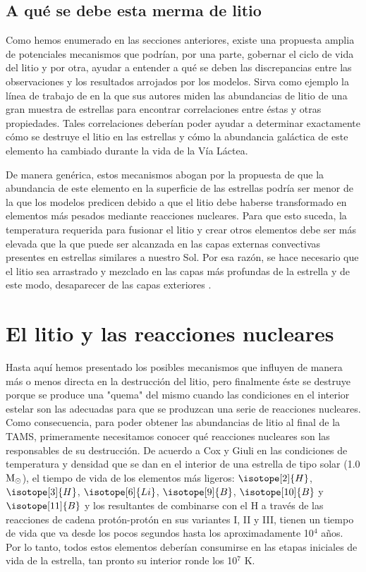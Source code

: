 \subsection{A qué se debe esta merma de litio}
Como hemos enumerado en las secciones anteriores, existe una propuesta amplia de potenciales mecanismos que podrían, por una parte, gobernar el ciclo de vida del litio y por otra, ayudar a entender a qué se deben las discrepancias entre las observaciones y los resultados arrojados por los modelos. Sirva como ejemplo la línea de trabajo de \cite{Ramirez2012} en la que sus autores miden las abundancias de litio de una gran muestra de estrellas para encontrar correlaciones entre éstas y otras propiedades. Tales correlaciones deberían poder ayudar a determinar exactamente cómo se destruye el litio en las estrellas y cómo la abundancia galáctica de este elemento ha cambiado durante la vida de la Vía Láctea.\par 

De manera genérica, estos mecanismos abogan por la propuesta de que la abundancia de este elemento en la superficie de las estrellas podría ser menor de la que los modelos predicen debido a que el litio debe haberse transformado en elementos más pesados mediante reacciones nucleares. Para que esto suceda, la temperatura requerida para fusionar el litio y crear otros elementos debe ser más elevada que la que puede ser alcanzada en las capas externas convectivas presentes en estrellas similares a nuestro Sol. Por esa razón, se hace necesario que el litio sea arrastrado y mezclado en las capas más profundas de la estrella y de este modo, desaparecer de las capas exteriores \citep{Pinsonneault1997}.\par


\section{El litio y las reacciones nucleares} \label{sec:li_reac_nuc}
Hasta aquí hemos presentado los posibles mecanismos que influyen de manera más o menos directa en la destrucción del litio, pero finalmente éste se destruye porque se produce una "quema" del mismo cuando las condiciones en el interior estelar son las adecuadas para que se produzcan una serie de reacciones nucleares. Como consecuencia, para poder obtener las abundancias de litio al final de la TAMS, primeramente necesitamos conocer qué reacciones nucleares son las responsables de su destrucción. De acuerdo a Cox y Giuli \citep{Cox1968} en las condiciones de temperatura y densidad que se dan en el interior de una estrella de tipo solar (1.0 $\mathrm{M}_\odot$), el tiempo de vida de los elementos más ligeros: $\isotope[2]{H}$, $\isotope[3]{H}$, $\isotope[6]{Li}$, $\isotope[9]{B}$, $\isotope[10]{B}$ y $\isotope[11]{B}$ y los resultantes de combinarse con el H a través de las reacciones de cadena protón-protón en sus variantes I, II y III, tienen un tiempo de vida que va desde los pocos segundos hasta los aproximadamente 10$^4$ años. Por lo tanto, todos estos elementos deberían consumirse en las etapas iniciales de vida de la estrella, tan pronto su interior ronde los 10$^7$ K.\par

